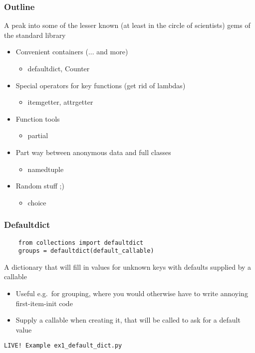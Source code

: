 \documentclass{beamer}
\begin{document}
\begin{frame}
  \frametitle{Outline}

  A peak into some of the lesser known (at least in the circle of
  scientists) gems of the standard library
  \begin{itemize}
  \item Convenient containers (... and more)
    \begin{itemize}
    \item defaultdict, Counter
    \end{itemize}
  \item Special operators for key functions (get rid of lambdas)
    \begin{itemize}
    \item itemgetter, attrgetter
    \end{itemize}
  \item Function tools
    \begin{itemize}
    \item partial
    \end{itemize}
  \item Part way between anonymous data and full classes
    \begin{itemize}
    \item namedtuple
    \end{itemize}
  \item Random stuff ;)
    \begin{itemize}
    \item choice
    \end{itemize}
  \end{itemize}
\end{frame}

\begin{frame}[fragile]
  \frametitle{Defaultdict}
  \begin{verbatim}
    from collections import defaultdict
    groups = defaultdict(default_callable)
  \end{verbatim}
  \begin{block}{\vspace*{-3ex}}
    A dictionary that will fill in values for unknown keys with
    defaults supplied by a callable
  \end{block}
  \begin{itemize}
  \item Useful e.g.\ for grouping, where you would otherwise have to
    write annoying first-item-init code
  \item Supply a callable when creating it, that will be called to ask
    for a default value
  \end{itemize}
  \begin{center}
    \texttt{LIVE! Example ex1\_default\_dict.py}
  \end{center}
\end{frame}
\end{document}
